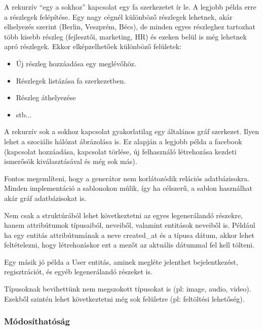 \documentclass[a4paper,12pt,oneside]{report}
\begin{document}
\begin{justify}
	A rekurzív “egy a sokhoz” kapcsolat egy fa szerkezetet ír le. A legjobb példa erre a részlegek felépítése. Egy nagy cégnél különböző részlegek lehetnek, akár elhelyezés szerint (Berlin, Veszprém, Bécs), de minden egyes részleghez tartozhat több kisebb részleg (fejlesztői, marketing, HR) és ezeken belül is még lehetnek apró részlegek. Ekkor elképzelhetőek különböző felületek: 

	\begin{itemize}
		\item Új részleg hozzáadása egy meglévőhöz. 
		\item Részlegek listázása fa szerkezetben. 
		\item Részleg áthelyezése
		\item stb...
	\end{itemize}

	A rekurzív sok a sokhoz kapcsolat gyakorlatilag egy általános gráf szerkezet. Ilyen lehet a szociális hálózat ábrázolása is. Ez alapján a legjobb példa a facebook (kapcsolat hozzáadása, kapcsolat törlése, új felhasználó létrehozása kezdeti ismerősök kiválasztásával és még sok más). 

	Fontos megemlíteni, hogy a generátor nem korlátozódik relációs adatbázisokra. Minden implementáció a sablonokon múlik, így ha célszerű, a sablon használhat akár gráf adatbázisokat is.   

	Nem csak a struktúrából lehet következtetni az egyes legenerálandó részekre, hanem attribútumok típusaiból, neveiből, valamint entitások neveiből is. Például ha egy entitás attribútumának a neve created\_at és a típusa dátum, akkor lehet feltételezni, hogy létrehozáskor ezt a mezőt az aktuális dátummal fel kell tölteni. 

	Egy másik jó példa a User entitás, aminek megléte jelenthet bejelentkezést, regisztrációt, és egyéb legenerálandó részeket is.

	Típusoknak bevihettünk nem megszokott típusokat is (pl: image, audio, video). Ezekből szintén lehet következtetni még sok felületre (pl: feltöltési lehetőség).

\end{justify}

\newpage
\subsubsection{Módosíthatóság}
\end{document}
